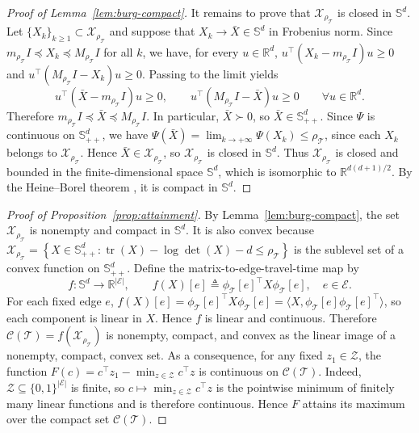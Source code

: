 \documentclass[11pt, letterpaper, oneside, reqno]{amsart}
\DeclareMathOperator{\Tr}{tr}
\newcommand{\Let}{\triangleq}
\begin{document}
\begin{proof}[Proof of Lemma~\ref{lem:burg-compact}]
It remains to prove that $\mathcal X_{\rho_{\mathcal T}}$ is closed in $\mathbb S^d$. Let $\{X_k\}_{k\ge 1}\subset \mathcal X_{\rho_{\mathcal T}}$ and suppose that
$X_k \to \bar X \in \mathbb S^d$ 
in Frobenius norm. Since
$m_{\rho_{\mathcal T}} I \preceq X_k \preceq M_{\rho_{\mathcal T}} I$ for all $k$,
we have, for every $u\in\mathbb R^d$,
$u^\top(X_k-m_{\rho_{\mathcal T}}I)u \ge 0$ and $u^\top(M_{\rho_{\mathcal T}}I-X_k)u \ge 0$.
Passing to the limit yields
\[
u^\top(\bar X-m_{\rho_{\mathcal T}}I)u \ge 0,
\qquad
u^\top(M_{\rho_{\mathcal T}}I-\bar X)u \ge 0
\qquad \forall u\in\mathbb R^d.
\]
Therefore
$m_{\rho_{\mathcal T}} I \preceq \bar X \preceq M_{\rho_{\mathcal T}} I$.
In particular, $\bar X \succ 0$, so $\bar X \in \mathbb S_{++}^d$.
Since $\Psi$ is continuous on $\mathbb S_{++}^d$, we have
$\Psi(\bar X)=\lim_{k\to+\infty}\Psi(X_k)\le \rho_{\mathcal T}$,
since each $X_k$ belongs to $\mathcal X_{\rho_{\mathcal T}}$. Hence $\bar X\in\mathcal X_{\rho_{\mathcal T}}$, so $\mathcal X_{\rho_{\mathcal T}}$ is closed in $\mathbb S^d$.
Thus $\mathcal X_{\rho_{\mathcal T}}$ is closed and bounded in the finite-dimensional space $\mathbb S^d$, which is isomorphic to $\mathbb R^{d(d+1)/2}$. By the Heine--Borel theorem \cite[Theorem~2.41]{ref:rudin1976principles}, it is compact in $\mathbb S^d$.
\end{proof}

\begin{proof}[Proof of Proposition~\ref{prop:attainment}]
By Lemma~\ref{lem:burg-compact}, the set $\mathcal X_{\rho_{\mathcal T}}$ is nonempty and compact in $\mathbb S^d$. It is also convex because
$\mathcal X_{\rho_{\mathcal T}}
= \left\{X\in\mathbb S_{++}^d : \Tr(X)-\log\det(X)-d\le \rho_{\mathcal T}\right\}$
is the sublevel set of a convex function on $\mathbb S_{++}^d$.
Define the matrix-to-edge-travel-time map by
\[
f:\mathbb S^d\to\mathbb R^{|\mathcal E|},
\qquad
f(X)[e] \Let \phi_{\mathcal T}[e]^\top X \phi_{\mathcal T}[e], \quad e\in\mathcal E.
\]
For each fixed edge $e$,
$f(X)[e]
= \phi_{\mathcal T}[e]^\top X \phi_{\mathcal T}[e]
= \langle X,\phi_{\mathcal T}[e]\phi_{\mathcal T}[e]^\top\rangle$,
so each component is linear in $X$. Hence $f$ is linear and continuous. Therefore $\mathcal C(\mathcal T)=f(\mathcal X_{\rho_{\mathcal T}})$ is nonempty, compact, and convex as the linear image of a nonempty, compact, convex set. 
As a consequence, for any fixed $z_1\in\mathcal Z$, the function $F(c) = c^\top z_1 - \min_{z\in\mathcal Z} c^\top z$ is continuous on $\mathcal C(\mathcal T)$. Indeed, $\mathcal Z\subseteq\{0,1\}^{|\mathcal E|}$ is finite, so $c\mapsto \min_{z\in\mathcal Z} c^\top z$ is the pointwise minimum of finitely many linear functions and is therefore continuous. Hence $F$ attains its maximum over the compact set $\mathcal C(\mathcal T)$.
\end{proof}
\end{document}
